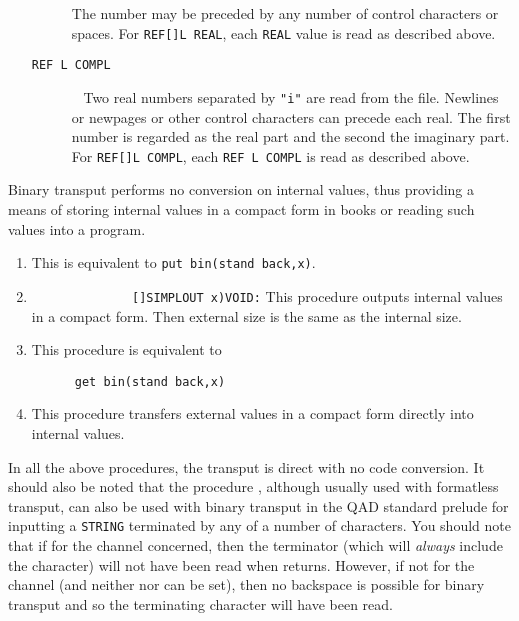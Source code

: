 \begin{enumerate}
\begin{description}
\begin{itemize}
\end{itemize}
The number may be preceded by any number of control characters or
spaces. For \verb|REF[]L REAL|, each \verb|REAL| value is read as
described above.
\item[\texttt{REF L COMPL}]\ \newline
Two real numbers separated by \verb|"i"| are read
from the file. Newlines or newpages or other control characters can
precede each real. The first number is regarded as the real part and
the second the imaginary part. For \verb|REF[]L COMPL|, each
\verb|REF L COMPL| is read as described above.
\end{description}
\end{enumerate}

Binary transput performs no conversion on internal values, thus
providing a means of storing internal values in a compact form in
books or reading such values into a program.
\begin{enumerate}
\item {}\newline
This is equivalent to \verb|put bin(stand back,x)|.
\item {}\newline
\verb|              []SIMPLOUT x)VOID:|\newline
This procedure outputs internal values in a compact form. Then
external size is the same as the internal size.
\item {}\newline
This procedure is equivalent to
\begin{verbatim}
      get bin(stand back,x)
\end{verbatim}
\item {}\newline
This procedure transfers external values in a compact form directly
into internal values.
\end{enumerate}
In all the above procedures, the transput is direct with no code
conversion. It should also be noted that the procedure
, although usually used with formatless transput, can
also be used with binary transput in the QAD standard prelude for
inputting a \verb|STRING| terminated by any of a number of
characters. You should note that if  for the channel
concerned, then the terminator (which will \textit{always} include
the  character) will not have been read when 
returns. However, if not  for the channel (and neither
 nor  can be set), then no backspace is
possible for binary transput and so the terminating character will
have been read.

